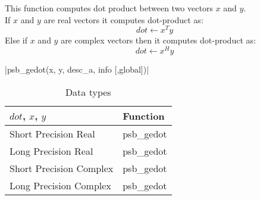 This function computes dot product between two vectors $x$ and
$y$.\\
If $x$ and $y$ are real vectors
it computes dot-product as:
\[dot \leftarrow x^T y\]
Else if $x$ and $y$ are complex vectors then it computes dot-product as:
\[dot \leftarrow x^H y\]

\fortinline|psb_gedot(x, y, desc_a, info [,global])|
\begin{table}[h]
\begin{center}
\begin{tabular}{ll}
\hline
$dot$, $x$, $y$ & {\bf Function}\\
\hline
Short Precision Real & psb\_gedot \\
Long Precision Real & psb\_gedot \\
Short Precision Complex & psb\_gedot \\
Long Precision Complex & psb\_gedot \\
\hline
\end{tabular}
\end{center}
\caption{Data types\label{tab:f90dot}}
\end{table}

